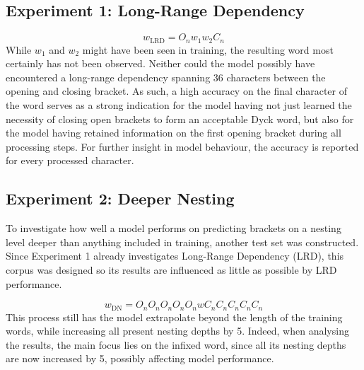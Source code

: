\subsection{Experiment 1: Long-Range Dependency}\label{LRD}
\[
	w_{\text{LRD}} = O_{n}w_{1}w_{2}C_{n}
\]
While $w_{1}$ and $w_{2}$ might have been seen in training, the resulting word most certainly has not been observed. Neither could the model possibly have encountered a long-range dependency spanning $36$ characters between the opening and closing bracket. As such, a high accuracy on the final character of the word serves as a strong indication for the model having not just learned the necessity of closing open brackets to form an acceptable Dyck word, but also for the model having retained information on the first opening bracket during all processing steps. For further insight in model behaviour, the accuracy is reported for every processed character.

\subsection{Experiment 2: Deeper Nesting}\label{DN}
To investigate how well a model performs on predicting brackets on a nesting level deeper than anything included in training, another test set was constructed. Since Experiment 1 already investigates Long-Range Dependency (LRD), this corpus was designed so its results are influenced as little as possible by LRD performance.

\[
	w_{\text{DN}} = O_{n}O_{n}O_{n}O_{n}O_{n}wC_{n}C_{n}C_{n}C_{n}C_{n}
\]
This process still has the model extrapolate beyond the length of the training words, while increasing all present nesting depths by 5. Indeed, when analysing the results, the main focus lies on the infixed word, since all its nesting depths are now increased by 5, possibly affecting model performance.